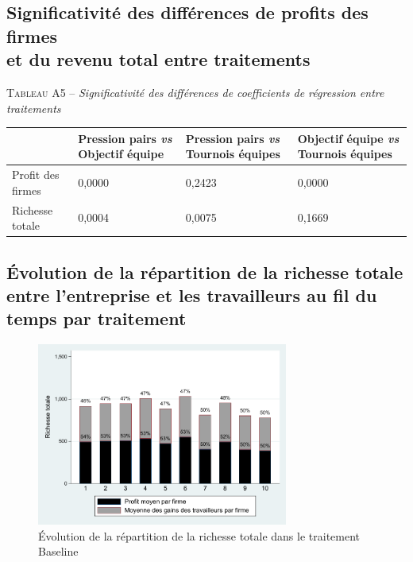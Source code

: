 \begin{Article}
\begin{refsection}[Lebourges]
\begin{appendices}
\subsection{Significativité des différences de profits des firmes\\ et du revenu total entre traitements}
\label{Annexe:Significativité différences de profits}

\vspace{0.2cm}
{\centering \textsc{Tableau A5} -- \emph{Significativité des différences de coefficients de régression entre traitements}\par}
\begin{table}[h!]
\label{tab_A5}
\centering
\begin{tabular}{m{2.6cm}D{2.3cm}D{2.3cm}D{2.3cm}}
\toprule
& Pression pairs \emph{vs} Objectif équipe & Pression pairs \emph{vs} Tournois équipes & Objectif équipe \emph{vs} Tournois équipes \tabularnewline
\midrule
Profit des firmes & 0,0000 & 0,2423 & 0,0000 \tabularnewline
Richesse totale & 0,0004 & 0,0075 & 0,1669 \tabularnewline
\bottomrule
\end{tabular}
\end{table}

\subsection{Évolution de la répartition de la richesse totale\\ entre
l'entreprise et les travailleurs au fil du temps par traitement}
\label{Annexe:Évolution répartition}

\begin{figure}[h]
    \centering
    \caption{Évolution de la répartition de la richesse totale dans le
traitement Baseline}
    \includegraphics[height=6cm]{05_graphA8.pdf}
\end{figure}


\end{appendices}
\end{refsection}
\end{Article}
